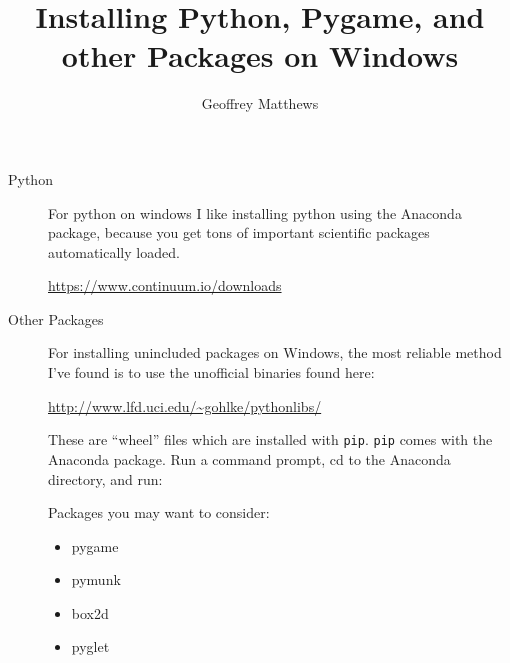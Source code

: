 \documentclass{article}
\title{Installing Python, Pygame, and other Packages on Windows}
\author{Geoffrey Matthews}
\begin{document}
\maketitle
\begin{description}
\item[Python] For python on windows I like installing python using the
  Anaconda package, because you get tons of important scientific
  packages automatically loaded.

\url{https://www.continuum.io/downloads}

\item[Other Packages] For installing unincluded packages on Windows, the
  most reliable method I've found is to use the unofficial binaries
  found here:

  \url{http://www.lfd.uci.edu/~gohlke/pythonlibs/}

  These are ``wheel'' files which are installed with {\tt pip}.
  {\tt  pip} comes with the Anaconda package.  Run a command prompt,
  cd to the Anaconda directory, and run:




  Packages you may want to consider:
  \begin{itemize}
  \item pygame
  \item pymunk
  \item box2d
  \item pyglet
  \end{itemize}
\end{description}
\end{document}

